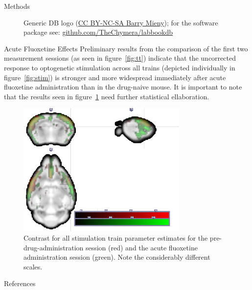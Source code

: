 \documentclass{beamer}
\begin{document}
\begin{frame}
\begin{tudcolumn}{.48\textwidth}
\begin{myblock}{Methods}
\begin{figure}
\begin{minipage}{0.45\textwidth}
								\caption{Generic DB logo
									(\href{https://creativecommons.org/licenses/by-nc-sa/3.0/}{CC BY-NC-SA Barry Mieny});
									for the software package see:
									\href{https://github.com/TheChymera/labbookdb}{github.com/TheChymera/labbookdb}}
							\end{minipage}
						\end{figure}
					\end{myblock}
					\begin{myblock}{Acute Fluoxetine Effects}
						Preliminary results from the comparison of the first two
						measurement sessions (as seen in figure~\ref{fig:tt}) indicate
						that the uncorrected response to optogenetic stimulation across
						all trains (depicted individually in figure~\ref{fig:stim}) is
						stronger and more widespread immediately after acute fluoxetine
						administration than in the drug-naive mouse.
						It is important to note that the results seen in
						figure~\ref{fig:fail} need further statistical ellaboration.
						\begin{figure}
							\begin{minipage}{0.85\textwidth}
								\centering\includegraphics[width=0.75\textwidth]{img/fail.png}
								\caption{Contrast for all stimulation train parameter estimates
								for the pre-drug-administration session (red) and the acute
								fluoxetine administration session (green).
								Note the considerably different scales.}
								\label{fig:fail}
							\end{minipage}
						\end{figure}
					\end{myblock}
					\begin{myblock}{References}
						\footnotesize
						
						
					\end{myblock}
	\end{tudcolumn}
\end{frame}
\end{document}
